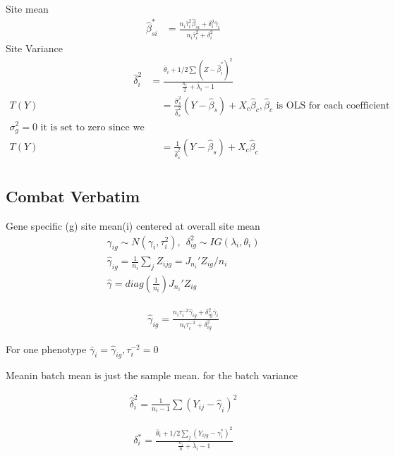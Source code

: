 \documentclass{article}
\begin{document}
Site mean
\begin{align*}
	\hat \beta^*_{si} & = \frac{n_i\bar \tau_i^2 \hat \beta_{si} + \delta^2_{i}\bar \gamma_i}{n_i\bar \tau_i^2 + \delta^2_{i}}
\end{align*}
Site Variance
\begin{align*}
	\hat \delta^2_i & = \frac{\bar \theta_i + 1/2 \sum(Z - \hat \beta_i^*)^2}{\frac{n_i}{2} + \bar \lambda_i - 1}
\end{align*} 
\begin{align*}
	T(Y) & = \frac{\hat \sigma_s^2}{\hat \delta^2_s}(Y-\hat \beta_s) + X_c \hat \beta_c, \hat \beta_c \text{ is OLS for each coefficient}\\
	\sigma_g^2 =0 \text{ it is set to zero since we standardize it} \\
	T(Y) & = \frac{1}{\hat \delta^2_s}(Y-\hat \beta_s) + X_c \hat \beta_c\\
\end{align*}




\subsection{Combat Verbatim}
Gene specific (g) site mean(i) centered at overall site mean
\begin{align*}
	\gamma_{ig} \sim N(\gamma_i, \tau_i^2), ~~ \delta_{ig}^2 \sim IG (\lambda_i, \theta_i) \\
	\hat \gamma_{ig} = \frac 1{n_i}\sum_j Z_{ijg} = J_{n_i}'Z_{ig} / n_i \\
	\hat \gamma = diag(\frac 1{n_i})J_{n_i}'Z_{ig}
\end{align*}



\begin{align*}
	\hat \gamma_{ig} = \frac{n_i \tau_i^{-2}\hat \gamma_{ig} + \delta_{ig}^2\bar \gamma_i}{n_i \tau_i^{-2} + \delta_{ig}^2}
\end{align*}

For one phenotype $\bar \gamma_i = \hat \gamma_{ig}, \tau_i^{-2} = 0$

Meanin batch mean is just the sample mean. for the batch variance

\begin{align*}
	\hat \delta_i^2 = \frac{1}{n_i-1} \sum (Y_{ij} - \hat \gamma_i)^2
\end{align*}




\begin{align*}
	\delta_i^* = \frac{\bar \theta_i + 1/2 \sum_j(Y_{ijg} - \gamma_i^*)^2}{\frac{n_i}n + \bar \lambda_i - 1}
\end{align*}
\end{document}
